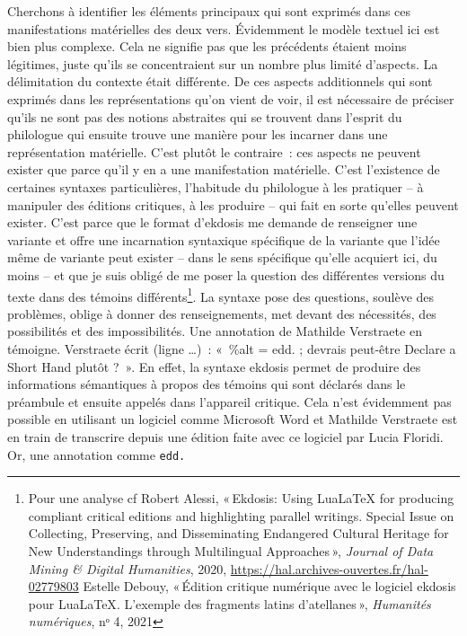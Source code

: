 Cherchons à identifier les éléments principaux qui sont exprimés dans
ces manifestations matérielles des deux vers. Évidemment le modèle
textuel ici est bien plus complexe. Cela ne signifie pas que les
précédents étaient moins légitimes, juste qu'ils se concentraient sur un
nombre plus limité d'aspects. La délimitation du contexte était
différente. De ces aspects additionnels qui sont exprimés dans les
représentations qu'on vient de voir, il est nécessaire de préciser
qu'ils ne sont pas des notions abstraites qui se trouvent dans l'esprit
du philologue qui ensuite trouve une manière pour les incarner dans une
représentation matérielle. C'est plutôt le contraire~: ces aspects ne
peuvent exister que parce qu'il y en a une manifestation matérielle.
C'est l'existence de certaines syntaxes particulières, l'habitude du
philologue à les pratiquer -- à manipuler des éditions critiques, à les
produire -- qui fait en sorte qu'elles peuvent exister. C'est parce que
le format d'ekdosis me demande de renseigner une variante et offre une
incarnation syntaxique spécifique de la variante que l'idée même de
variante peut exister -- dans le sens spécifique qu'elle acquiert ici,
du moins -- et que je suis obligé de me poser la question des
différentes versions du texte dans des témoins différents\footnote{Pour
  une analyse cf Robert Alessi, {«\,Ekdosis: {Using} {LuaLaTeX} for
  producing compliant critical editions and highlighting parallel
  writings. {Special} {Issue} on {Collecting}, {Preserving}, and
  {Disseminating} {Endangered} {Cultural} {Heritage} for {New}
  {Understandings} through {Multilingual} {Approaches}\,»},
  \emph{Journal of Data Mining \& Digital Humanities}, 2020,
  \url{https://hal.archives-ouvertes.fr/hal-02779803} Estelle Debouy,
  {«\,Édition critique numérique avec le logiciel ekdosis pour
  {LuaLaTeX}. {L}'exemple des fragments latins d'atellanes\,»},
  \emph{Humanités numériques}, nᵒ 4, 2021}. La syntaxe pose des
questions, soulève des problèmes, oblige à donner des renseignements,
met devant des nécessités, des possibilités et des impossibilités. Une
annotation de Mathilde Verstraete en témoigne. Verstraete écrit (ligne
\ldots)~: «~\%alt = edd. ; devrais peut-être Declare a Short Hand plutôt
?~». En effet, la syntaxe ekdosis permet de produire des informations
sémantiques à propos des témoins qui sont déclarés dans le préambule et
ensuite appelés dans l'appareil critique. Cela n'est évidemment pas
possible en utilisant un logiciel comme Microsoft Word et Mathilde
Verstraete est en train de transcrire depuis une édition faite avec ce
logiciel par Lucia Floridi. Or, une annotation comme \texttt{edd.}
